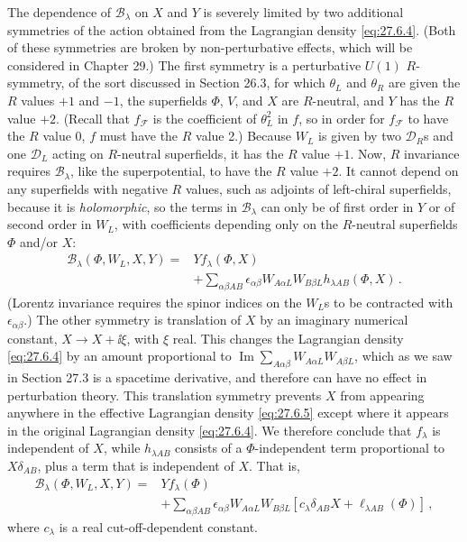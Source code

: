 The dependence of \(\mathcal{B}_\lambda\) on \(X\) and \(Y\) is severely
limited by two additional symmetries of the action obtained from the
Lagrangian density \eqref{eq:27.6.4}. (Both of these symmetries are broken by
non-perturbative effects, which will be considered in Chapter 29.) The first
symmetry is a perturbative \(U(1)\) \(R\)-symmetry, of the sort discussed in
Section 26.3, for which \(\theta_L\) and \(\theta_R\) are given the \(R\)
values \(+1\) and \(-1\), the superfields \(\Phi\), \(V\), and \(X\) are
\(R\)-neutral, and \(Y\) has the \(R\) value \(+2\). (Recall that
\(f_{\mathcal{F}}\) is the coefficient of \(\theta_L^2\) in \(f\), so in
order for \(f_{\mathcal{F}}\) to have the \(R\) value 0, \(f\) must have
the \(R\) value 2.) Because \(W_L\) is given by two \(\mathcal{D}_R\)s and
one \(\mathcal{D}_L\) acting on \(R\)-neutral superfields, it has the \(R\)
value \(+1\). Now, \(R\) invariance requires \(\mathcal{B}_\lambda\), like
the superpotential, to have the \(R\) value \(+2\). It cannot depend on any
superfields with negative \(R\) values, such as adjoints of left-chiral
superfields, because it is \emph{holomorphic}, so the terms in
\(\mathcal{B}_\lambda\) can only be of first order in \(Y\) or of second
order in \(W_L\), with coefficients depending only on the \(R\)-neutral
superfields \(\Phi\) and/or \(X\):
\begin{equation}
  \begin{aligned}
  \mathcal{B}_\lambda(\Phi,W_L,X,Y)
  ={}&
  Yf_\lambda(\Phi,X)
  \\
  &+\sum_{\alpha\beta AB}
  \epsilon_{\alpha\beta}W_{A\alpha L}W_{B\beta L}
  h_{\lambda AB}(\Phi,X)\,.
  \end{aligned}
  \tag{27.6.6}\label{eq:27.6.6}
\end{equation}
(Lorentz invariance requires the spinor indices on the \(W_L\)s to be
contracted with \(\epsilon_{\alpha\beta}\).) The other symmetry is
translation of \(X\) by an imaginary numerical constant,
\(X\longrightarrow X+\ii\xi\), with \(\xi\) real. This changes the Lagrangian
density \eqref{eq:27.6.4} by an amount proportional to
\(\operatorname{Im}\sum_{A\alpha\beta}W_{A\alpha L}W_{A\beta L}\), which as
we saw in Section 27.3 is a spacetime derivative, and therefore can have no
effect in perturbation theory. This translation symmetry prevents \(X\)
from appearing anywhere in the effective Lagrangian density
\eqref{eq:27.6.5} except where it appears in the original Lagrangian density
\eqref{eq:27.6.4}. We therefore conclude that \(f_\lambda\) is independent
of \(X\), while \(h_{\lambda AB}\) consists of a \(\Phi\)-independent term
proportional to \(X\delta_{AB}\), plus a term that is independent of \(X\).
That is,
\begin{equation}
  \begin{aligned}
  \mathcal{B}_\lambda(\Phi,W_L,X,Y)
  ={}&
  Yf_\lambda(\Phi)
  \\
  &+\sum_{\alpha\beta AB}
  \epsilon_{\alpha\beta}W_{A\alpha L}W_{B\beta L}
  \left[
    c_\lambda\delta_{AB}X+\ell_{\lambda AB}(\Phi)
  \right]\,,
  \end{aligned}
  \tag{27.6.7}\label{eq:27.6.7}
\end{equation}
where \(c_\lambda\) is a real cut-off-dependent constant.

